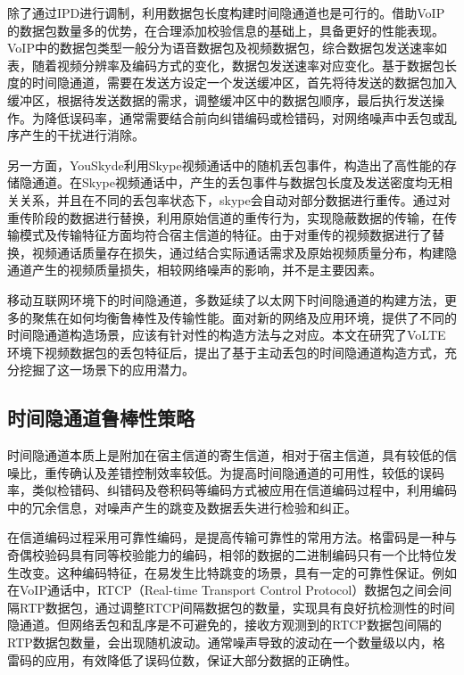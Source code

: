 除了通过IPD进行调制，利用数据包长度构建时间隐通道也是可行的。借助VoIP的数据包数量多的优势，在合理添加校验信息的基础上，具备更好的性能表现。VoIP中的数据包类型一般分为语音数据包及视频数据包，综合数据包发送速率如表，随着视频分辨率及编码方式的变化，数据包发送速率对应变化。基于数据包长度的时间隐通道，需要在发送方设定一个发送缓冲区，首先将待发送的数据包加入缓冲区，根据待发送数据的需求，调整缓冲区中的数据包顺序，最后执行发送操作。为降低误码率，通常需要结合前向纠错编码或检错码，对网络噪声中丢包或乱序产生的干扰进行消除。

另一方面，YouSkyde利用Skype视频通话中的随机丢包事件，构造出了高性能的存储隐通道。在Skype视频通话中，产生的丢包事件与数据包长度及发送密度均无相关关系，并且在不同的丢包率状态下，skype会自动对部分数据进行重传。通过对重传阶段的数据进行替换，利用原始信道的重传行为，实现隐蔽数据的传输，在传输模式及传输特征方面均符合宿主信道的特征。由于对重传的视频数据进行了替换，视频通话质量存在损失，通过结合实际通话需求及原始视频质量分布，构建隐通道产生的视频质量损失，相较网络噪声的影响，并不是主要因素。

移动互联网环境下的时间隐通道，多数延续了以太网下时间隐通道的构建方法，更多的聚焦在如何均衡鲁棒性及传输性能。面对新的网络及应用环境，提供了不同的时间隐通道构造场景，应该有针对性的构造方法与之对应。本文在研究了VoLTE环境下视频数据包的丢包特征后，提出了基于主动丢包的时间隐通道构造方式，充分挖掘了这一场景下的应用潜力。

\subsection{时间隐通道鲁棒性策略}
\label{sec:intro:background:robustness}

时间隐通道本质上是附加在宿主信道的寄生信道，相对于宿主信道，具有较低的信噪比，重传确认及差错控制效率较低。为提高时间隐通道的可用性，较低的误码率，类似检错码、纠错码及卷积码等编码方式被应用在信道编码过程中，利用编码中的冗余信息，对噪声产生的跳变及数据丢失进行检验和纠正。

在信道编码过程采用可靠性编码，是提高传输可靠性的常用方法。格雷码是一种与奇偶校验码具有同等校验能力的编码，相邻的数据的二进制编码只有一个比特位发生改变。这种编码特征，在易发生比特跳变的场景，具有一定的可靠性保证。例如在VoIP通话中，RTCP（Real-time Transport Control Protocol）数据包之间会间隔RTP数据包，通过调整RTCP间隔数据包的数量，实现具有良好抗检测性的时间隐通道。但网络丢包和乱序是不可避免的，接收方观测到的RTCP数据包间隔的RTP数据包数量，会出现随机波动。通常噪声导致的波动在一个数量级以内，格雷码的应用，有效降低了误码位数，保证大部分数据的正确性。

